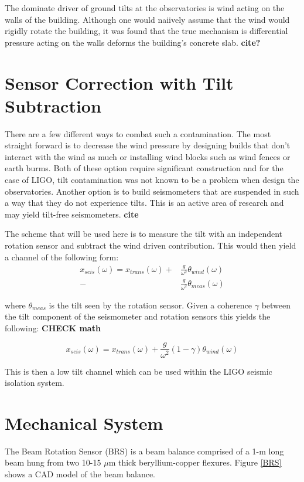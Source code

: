 \documentclass [12pt, proquest]{uwthesis}[2019]
\begin{document}
The dominate driver of ground tilts at the observatories is wind acting on the walls of the building. Although one would naiively assume that the wind would rigidly rotate the building, it was found that the true mechanism is differential pressure acting on the walls deforms the building's concrete slab. \textbf{cite?} 

\section{Sensor Correction with Tilt Subtraction}

\quad There are a few different ways to combat such a contamination. The most straight forward is to decrease the wind pressure by designing builds that don't interact with the wind as much or installing wind blocks such as wind fences or earth burms. Both of these option require significant construction and for the case of LIGO, tilt contamination was not known to be a problem when design the observatories. Another option is to build seismometers that are suspended in such a way that they do not experience tilts. This is an active area of research and may yield tilt-free seismometers. \textbf{cite}

The scheme that will be used here is to measure the tilt with an independent rotation sensor and subtract the wind driven contribution. This would then yield a channel of the following form:
\begin{align}
x_{seis}(\omega)=x_{trans}(\omega)+&\frac{g}{\omega^2}\theta_{wind}(\omega)\\
-&\frac{g}{\omega^2}\theta_{meas}(\omega)
\end{align}

where $\theta_{meas}$ is the tilt seen by the rotation sensor. Given a coherence $\gamma$ between the tilt component of the seismometer and rotation sensors this yields the following: \textbf{CHECK math}

\[x_{seis}(\omega)=x_{trans}(\omega)+\frac{g}{\omega^2}(1-\gamma)\theta_{wind}(\omega)\]

This is then a low tilt channel which can be used within the LIGO seismic isolation system.

\section{Mechanical System}

\quad The Beam Rotation Sensor (BRS) is a beam balance comprised of a 1-m long beam hung from two 10-15 $\mu$m thick beryllium-copper flexures. Figure \ref{BRS} shows a CAD model of the beam balance. 
\end{document}

